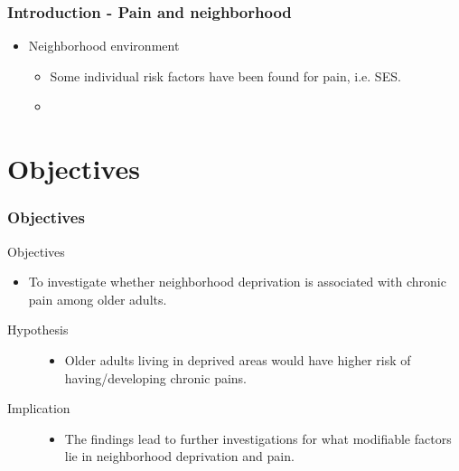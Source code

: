 \documentclass[dvipdfmx]{beamer}\usepackage[]{graphicx}\usepackage[]{color}
\begin{document}
\begin{frame}
	\frametitle{Introduction - Pain and neighborhood} 
	\begin{itemize}
		\item Neighborhood environment
			\begin{itemize}
				\item Some individual risk factors have been found for pain, i.e. SES.
				\item 
			\end{itemize}
	\end{itemize}
\end{frame}


\section{Objectives}
\begin{frame}
	\frametitle{Objectives}
	\begin{block}{Objectives}
		\begin{itemize}
			\item To investigate whether neighborhood deprivation is associated with chronic pain among older adults.
		\end{itemize}
	\end{block}
	\begin{description}
		\item[Hypothesis] \mbox{}\par
			\begin{itemize} 
				\item Older adults living in deprived areas would have higher risk of having/developing chronic pains.
			\end{itemize} 
		\item[Implication] \mbox{}\par
			\begin{itemize} 
				\item The findings lead to further investigations for what modifiable factors lie in neighborhood deprivation and pain.
			\end{itemize} 
	\end{description}
\end{frame}

\end{document}
